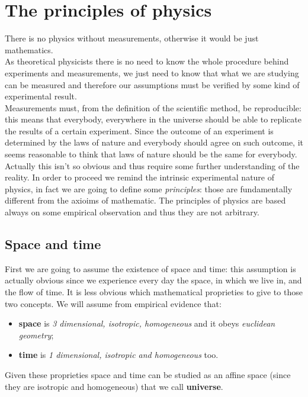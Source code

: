 \section{The principles of physics}
There is no physics without measurements, otherwise it would be just mathematics.\\
As theoretical physicists there is no need to know the whole procedure behind experiments and measurements, we just need to know that what we are studying can be measured and therefore our assumptions must be verified by some kind of experimental result.\\ Measurements must, from the definition of the scientific method, be reproducible: this means that everybody, everywhere in the universe should be able to replicate the results of a certain experiment. Since the outcome of an experiment is determined by the laws of nature and everybody should agree on such outcome, it seems reasonable to think that laws of nature should be the same for everybody.\\ Actually this isn't so obvious and thus require some further understanding of the reality. In order to proceed we remind the intrinsic experimental nature of physics, in fact we are going to define some \emph{principles}: those are fundamentally different from the axioims of mathematic. The principles of physics are based always on some empirical observation and thus they are not arbitrary.

\subsection{Space and time}  
First we are going to assume the existence of space and time: this assumption is actually obvious since we experience every day the space, in which we live in, and the flow of time. It is less obvious which mathematical proprieties to give to those two concepts. We will assume from empirical evidence that:
\begin{itemize}
    \item \textbf{space} is \emph{3 dimensional, isotropic, homogeneous} and it obeys \emph{euclidean geometry};
    \item \textbf{time} is \emph{1 dimensional, isotropic and homogeneous} too. 
\end{itemize}
Given these proprieties space and time can be studied as an affine space (since they are isotropic and homogeneous) that we call \textbf{universe}. 

